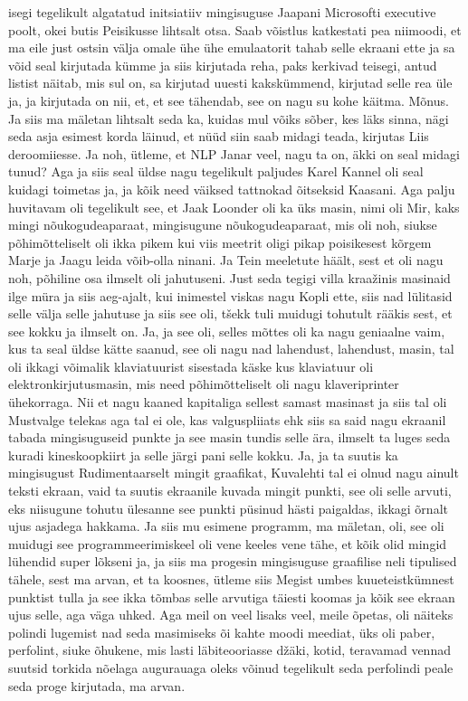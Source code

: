isegi tegelikult algatatud initsiatiiv mingisuguse Jaapani Microsofti executive poolt, okei butis Peisikusse lihtsalt otsa. Saab võistlus katkestati pea niimoodi, et ma eile just ostsin välja omale ühe ühe emulaatorit tahab selle ekraani ette ja sa võid seal kirjutada kümme ja siis kirjutada reha, paks kerkivad teisegi, antud listist näitab, mis sul on, sa kirjutad uuesti kakskümmend, kirjutad selle rea üle ja, ja kirjutada on nii, et, et see tähendab, see on nagu su kohe käitma. Mõnus. Ja siis ma mäletan lihtsalt seda ka, kuidas mul võiks sõber, kes läks sinna, nägi seda asja esimest korda läinud, et nüüd siin saab midagi teada, kirjutas Liis deroomiiesse.
Ja noh, ütleme, et NLP Janar veel, nagu ta on, äkki on seal midagi tunud?
Aga ja siis seal üldse nagu tegelikult paljudes Karel Kannel oli seal kuidagi toimetas ja, ja kõik need väiksed tattnokad õitseksid Kaasani. Aga palju huvitavam oli tegelikult see, et Jaak Loonder oli ka üks masin, nimi oli Mir, kaks mingi nõukogudeaparaat, mingisugune nõukogudeaparaat, mis oli noh, siukse põhimõtteliselt oli ikka pikem kui viis meetrit oligi pikap poisikesest kõrgem Marje ja Jaagu leida võib-olla ninani.
Ja Tein meeletute häält, sest et oli nagu noh, põhiline osa ilmselt oli jahutuseni. Just seda tegigi villa kraažinis masinaid ilge müra ja siis aeg-ajalt, kui inimestel viskas nagu Kopli ette, siis nad lülitasid selle välja selle jahutuse ja siis see oli, tšekk tuli muidugi tohutult rääkis sest, et see kokku ja ilmselt on. Ja, ja see oli, selles mõttes oli ka nagu geniaalne vaim, kus ta seal üldse kätte saanud, see oli nagu nad lahendust, lahendust, masin, tal oli ikkagi võimalik klaviatuurist sisestada käske kus klaviatuur oli elektronkirjutusmasin, mis need põhimõtteliselt oli nagu klaveriprinter ühekorraga. Nii et nagu kaaned kapitaliga sellest samast masinast ja siis tal oli
Mustvalge telekas aga tal ei ole, kas valguspliiats ehk siis sa said nagu ekraanil tabada mingisuguseid punkte ja see masin tundis selle ära, ilmselt ta luges seda kuradi kineskoopkiirt ja selle järgi pani selle kokku. Ja, ja ta suutis ka mingisugust Rudimentaarselt mingit graafikat, Kuvalehti tal ei olnud nagu ainult teksti ekraan, vaid ta suutis ekraanile kuvada mingit punkti, see oli selle arvuti, eks niisugune tohutu ülesanne see punkti püsinud hästi paigaldas, ikkagi õrnalt ujus asjadega hakkama. Ja siis mu esimene programm, ma mäletan, oli, see oli muidugi see programmeerimiskeel oli vene keeles vene tähe, et kõik olid mingid lühendid super lõkseni ja, ja siis ma progesin mingisuguse graafilise neli tipulised tähele, sest ma arvan, et ta koosnes, ütleme siis Megist umbes kuueteistkümnest punktist tulla ja see ikka tõmbas selle arvutiga täiesti koomas ja kõik see ekraan ujus selle, aga väga uhked. Aga meil on veel lisaks veel, meile õpetas, oli näiteks polindi lugemist nad seda masimiseks õi kahte moodi meediat, üks oli paber, perfolint, siuke õhukene, mis lasti läbiteooriasse džäki, kotid, teravamad vennad suutsid torkida nõelaga augurauaga oleks võinud tegelikult seda perfolindi peale seda proge kirjutada, ma arvan.
